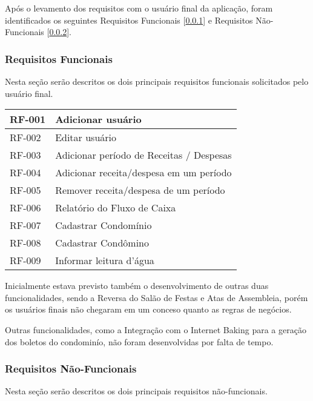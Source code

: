 \documentclass[12pt]{article}
\begin{document}
Após o levamento dos requisitos com o usuário final da aplicação, foram identificados os seguintes Requisitos Funcionais [\ref{Req-func}] e Requisitos Não-Funcionais [\ref{Req-nfunc}].

\subsubsection{Requisitos Funcionais}
\label{Req-func}
Nesta seção serão descritos os dois principais requisitos funcionais solicitados pelo usuário final.

\begin{center}
\begin{tabular}{| p{} | p{} |}
  \hline
  RF-001 & Adicionar usuário \\
  \hline
  RF-002 & Editar usuário \\
  \hline
  RF-003 & Adicionar período de Receitas / Despesas\\
  \hline
  RF-004 & Adicionar receita/despesa em um período \\
  \hline
  RF-005 & Remover receita/despesa de um período \\
  \hline  
   RF-006 & Relatório do Fluxo de Caixa \\
  \hline
   RF-007 & Cadastrar Condomínio \\
  \hline  
  RF-008 & Cadastrar Condômino \\
  \hline 
  RF-009 & Informar leitura d’água \\
  \hline
\end{tabular}
\end{center}

Inicialmente estava previsto também o desenvolvimento de outras duas funcionalidades, sendo a Reversa do Salão de Festas e Atas de Assembleia, porém os usuários finais não chegaram em um conceso quanto as regras de negócios.

Outras funcionalidades, como a Integração com o Internet Baking para a geração dos boletos do condominío, não foram desenvolvidas por falta de tempo.

\subsubsection{Requisitos Não-Funcionais}
\label{Req-nfunc}
Nesta seção serão descritos os dois principais requisitos não-funcionais.
\end{document}
